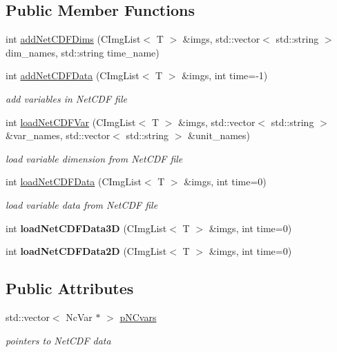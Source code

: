 \subsection*{Public Member Functions}
\begin{DoxyCompactItemize}
\item 
int \hyperlink{classCImgListNetCDF_aa6daeabeac3421f004136034abb702ba}{addNetCDFDims} (CImgList$<$ T $>$ \&imgs, std::vector$<$ std::string $>$ dim\_\-names, std::string time\_\-name)
\item 
int \hyperlink{classCImgListNetCDF_a696a8197593274e23af28420c473036e}{addNetCDFData} (CImgList$<$ T $>$ \&imgs, int time=-\/1)
\begin{DoxyCompactList}\small\item\em add variables in NetCDF file \item\end{DoxyCompactList}\item 
int \hyperlink{classCImgListNetCDF_ad01786b8525fdd438288db3ff23c8125}{loadNetCDFVar} (CImgList$<$ T $>$ \&imgs, std::vector$<$ std::string $>$ \&var\_\-names, std::vector$<$ std::string $>$ \&unit\_\-names)
\begin{DoxyCompactList}\small\item\em load variable dimension from NetCDF file \item\end{DoxyCompactList}\item 
int \hyperlink{classCImgListNetCDF_aac1fa2f44b04270740f88900753ef02a}{loadNetCDFData} (CImgList$<$ T $>$ \&imgs, int time=0)
\begin{DoxyCompactList}\small\item\em load variable data from NetCDF file \item\end{DoxyCompactList}\item 
\hypertarget{classCImgListNetCDF_a83a009637728bb3f43e66645b47ca05c}{
int {\bfseries loadNetCDFData3D} (CImgList$<$ T $>$ \&imgs, int time=0)}
\label{classCImgListNetCDF_a83a009637728bb3f43e66645b47ca05c}

\item 
\hypertarget{classCImgListNetCDF_a6f27732abaf844769523d4559368674e}{
int {\bfseries loadNetCDFData2D} (CImgList$<$ T $>$ \&imgs, int time=0)}
\label{classCImgListNetCDF_a6f27732abaf844769523d4559368674e}

\end{DoxyCompactItemize}
\subsection*{Public Attributes}
\begin{DoxyCompactItemize}
\item 
std::vector$<$ NcVar $\ast$ $>$ \hyperlink{classCImgListNetCDF_ad071043e517bec99d567e4b56630b865}{pNCvars}
\begin{DoxyCompactList}\small\item\em pointers to NetCDF data \item\end{DoxyCompactList}\end{DoxyCompactItemize}


